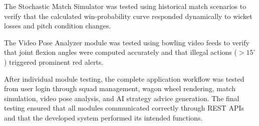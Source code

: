 The Stochastic Match Simulator was tested using historical match scenarios to verify that the calculated win-probability curve responded dynamically to wicket losses and pitch condition changes.

The Video Pose Analyzer module was tested using bowling video feeds to verify that joint flexion angles were computed accurately and that illegal actions ($> 15^{\circ}$) triggered prominent red alerts.

After individual module testing, the complete application workflow was tested from user login through squad management, wagon wheel rendering, match simulation, video pose analysis, and AI strategy advice generation. The final testing ensured that all modules communicated correctly through REST APIs and that the developed system performed its intended functions.
